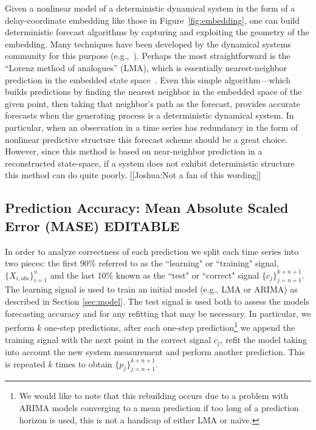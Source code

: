 Given a nonlinear model of a deterministic dynamical system in the
form of a delay-coordinate embedding like those in Figure~\ref{fig:embedding},
one can build deterministic forecast algorithms by capturing and
exploiting the geometry of the embedding.  Many techniques have been
developed by the dynamical systems community for this purpose
(e.g.,~\cite{weigend-book,casdagli-eubank92,Smith199250}).  Perhaps the most straightforward
is the ``Lorenz method of analogues'' (LMA), which is essentially
nearest-neighbor prediction in the embedded state
space~\cite{lorenz-analogues}.  Even this simple algorithm---which
builds predictions by finding the nearest neighbor in the embedded space of the given point, then taking that neighbor's path as the
forecast, provides accurate forecasts when the generating process is a deterministic dynamical system. In particular, when an observation in a time series has redundancy in the form of nonlinear predictive structure this forecast scheme should be a great choice. However, since this method is based on near-neighbor prediction in a reconstructed state-space, if a system does not exhibit deterministic structure this method can do quite poorly. {\color{red}[[Joshua:Not a fan of this wording]]}






\subsection{Prediction Accuracy: Mean Absolute Scaled Error (MASE) {\color{blue} EDITABLE}}
\label{sec:accuracy}

In order to analyze correctness of each prediction we split each time series into two pieces: the first 90\% referred to as the ``learning" or ``training" signal, $\{X_{i,obs}\}_{i=1}^{n}$ and the last 10\% known as the ``test" or ``correct" signal $\{c_j\}_{j=n+1}^{k+n+1}$. The learning signal is used to train an initial model (e.g., LMA or ARIMA) as described in Section \ref{sec:model}. The test signal is used both to assess the models forecasting accuracy and for any refitting that may be necessary. In particular, we perform $k$ one-step predictions, after each one-step prediction\footnote{We would like to note that this rebuilding occurs due to a problem with ARIMA models converging to a mean prediction if too long of a prediction horizon is used, this is not a handicap of either LMA or na\"ive.} we append the training signal with the next point in the correct signal $c_j$, refit the model taking into account the new system measurement and perform another prediction. This is repeated $k$ times to obtain $\{p_j\}_{j=n+1}^{k+n+1}$.

